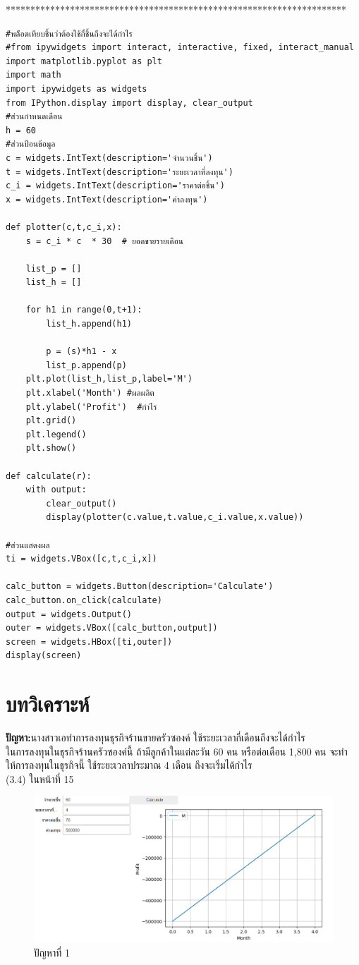 \documentclass{report}
\begin{document}
*********************************************************************
\begin{verbatim}
#พล็อตเทียบชิ้นว่าต้องใช้กี่ชิ้นถึงจะได้กำไร
#from ipywidgets import interact, interactive, fixed, interact_manual
import matplotlib.pyplot as plt
import math 
import ipywidgets as widgets
from IPython.display import display, clear_output
#ส่วนกำหนดเดือน
h = 60
#ส่วนป้อนข้อมูล
c = widgets.IntText(description='จำนวนชิ้น')
t = widgets.IntText(description='ระยะเวลาที่ลงทุน')
c_i = widgets.IntText(description='ราคาต่อชิ้น')
x = widgets.IntText(description='ค่าลงทุน')

def plotter(c,t,c_i,x):
    s = c_i * c  * 30  # ยอดขายรายเดือน
    
    list_p = []
    list_h = []
    
    for h1 in range(0,t+1):
        list_h.append(h1)

        p = (s)*h1 - x 
        list_p.append(p)
    plt.plot(list_h,list_p,label='M')
    plt.xlabel('Month') #ผลผลิต
    plt.ylabel('Profit')  #กำไร
    plt.grid()
    plt.legend()
    plt.show()
    
def calculate(r):
    with output:
        clear_output()
        display(plotter(c.value,t.value,c_i.value,x.value))

#ส่วนแสดงผล
ti = widgets.VBox([c,t,c_i,x])

calc_button = widgets.Button(description='Calculate')
calc_button.on_click(calculate)
output = widgets.Output()
outer = widgets.VBox([calc_button,output])
screen = widgets.HBox([ti,outer])
display(screen)
\end{verbatim}
\chapter{บทวิเคราะห์}
\textbf{ปัญหา:}นางสาวเอทำการลงทุนธุรกิจร้านขายครัวซองค์  ใช้ระยะเวลากี่เดือนถึงจะได้กำไร\\
	ในการลงทุนในธุรกิจร้านครัวซองค์นี้ ถ้ามีลูกค้าในแต่ละวัน 60 คน หรือต่อเดือน 1,800 คน จะทําให้การลงทุนในธุรกิจนี้ ใช้ระยะเวลาประมาณ 4 เดือน ถึงจะเริ่มได้กำไร \\
	(3.4) ในหน้าที่ 15

\begin{figure}[!ht]
    \centering
    \includegraphics[scale=0.43]{B1.png}
    \caption{ปัญหาที่ 1} 
\label{fig:mesh1}
\end{figure}
\end{document}
